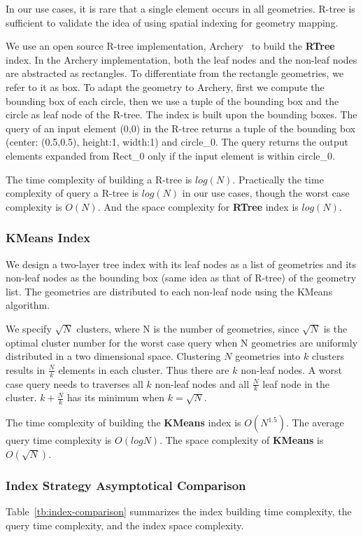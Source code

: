 \documentclass{sig-alternate}
\begin{document}
In our use cases, it is rare that a single element occurs in all geometries.  
R-tree is sufficient to validate the idea of using spatial indexing for geometry mapping.

We use an open source R-tree implementation, Archery~\cite{osheim13} to build the {\bf RTree} index.
In the Archery implementation, both the leaf nodes and the non-leaf nodes are abstracted as rectangles.
To differentiate from the rectangle geometries, we refer to it as box.
To adapt the geometry to Archery, first we compute the bounding box of each circle, then we use
a tuple of the bounding box and the circle as leaf node of the R-tree. 
The index is built upon the bounding boxes. 
The query of an input element (0,0) in the R-tree returns a tuple of the bounding box (center: (0.5,0.5), height:1, width:1) and circle\_0.
The query returns the output elements expanded from Rect\_0 only if the input element is within circle\_0.

The time complexity of building a R-tree is $log(N)$.
Practically the time complexity of query a R-tree is $log(N)$ in our use cases, though
the worst case complexity is $O(N)$.
And the space complexity for {\bf RTree} index is $log(N)$.

\subsubsection{KMeans Index}
We design a two-layer tree index with its leaf nodes as a list of geometries and its non-leaf nodes as the bounding box (same idea as that of R-tree)
of the geometry list.
The geometries are distributed to each non-leaf node using the KMeans~\cite{macqueen67} algorithm.

We specify $\sqrt{N}$ clusters, where N is the number of geometries, 
since $\sqrt{N}$ is the optimal cluster number for the worst case query when N geometries are uniformly distributed in a two dimensional space.
Clustering $N$ geometries into $k$ clusters results in $\frac{N}{k}$ elements in each cluster. 
Thus there are $k$ non-leaf nodes.
A worst case query needs to traverses all $k$ non-leaf nodes and all $\frac{N}{k}$ leaf node in the cluster.
$k+\frac{N}{k}$ has its minimum when $k=\sqrt{N}$. 

The time complexity of building the {\bf KMeans} index is $O(N^{1.5})$.
The average query time complexity is $O(logN)$.
The space complexity of {\bf KMeans} is $O(\sqrt{N})$.

\subsubsection{Index Strategy Asymptotical Comparison}
Table~\ref{tb:index-comparison} summarizes the index building time complexity, 
the query time complexity, and the index space complexity.
\end{document}
